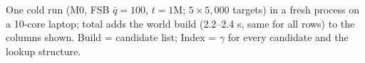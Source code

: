 One cold run (M0, FSB $\bar q=100$, $t=1$M; $5\times5{,}000$ targets) in a fresh process on a 10-core laptop; total adds the world build (2.2--2.4 s, same for all rows) to the columns shown. Build = candidate list; Index = $\gamma$ for every candidate and the lookup structure.
